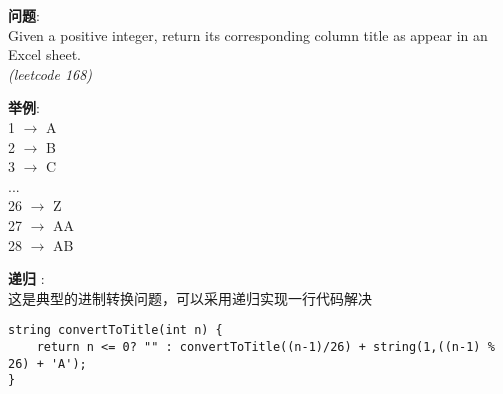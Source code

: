     
\begin{description}
    \item{\textbf{问题}}:\\
Given a positive integer, return its corresponding column title as appear in an Excel sheet.\\
\textit{(leetcode 168)}
    \item{\textbf{举例}}:\\
    1 $\rightarrow$ A \\
    2 $\rightarrow$ B \\
    3 $\rightarrow$ C \\
    ... \\
    26 $\rightarrow$ Z \\ 
    27 $\rightarrow$ AA \\
    28 $\rightarrow$ AB 
    \item{\textbf{递归}} : 
    \\这是典型的进制转换问题，可以采用递归实现一行代码解决
    \begin{lstlisting}
string convertToTitle(int n) {
	return n <= 0? "" : convertToTitle((n-1)/26) + string(1,((n-1) % 26) + 'A');   	    
}
    \end{lstlisting}
\end{description}
